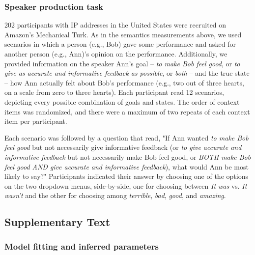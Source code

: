 \documentclass[12pt]{article}
\begin{document}
\subsubsection*{Speaker production task}

202 participants with IP addresses in the United States were recruited on Amazon's Mechanical Turk.
As in the semantics measurements above, we used scenarios in which a person (e.g., Bob) gave some performance and asked for another person (e.g., Ann)'s opinion on the performance. 
Additionally, we provided information on the speaker Ann's goal -- \emph{to make Bob feel good}, or \emph{to give as accurate and informative feedback as possible}, or \emph{both} -- 
and the true state -- how Ann actually felt about Bob's performance (e.g., two out of three hearts, on a scale from zero to three hearts). 
Each participant read 12 scenarios, depicting every possible combination of goals and states. 
The order of context items was randomized, and there were a maximum of two repeats of each context item per participant.

Each scenario was followed by a question that read, "If Ann wanted \emph{to make Bob feel good} but not necessarily give informative feedback (or \emph{to give accurate and informative feedback} but not necessarily make Bob feel good, or \emph{BOTH make Bob feel good AND give accurate and informative feedback}), what would Ann be most likely to say?" Participants indicated their answer by choosing one of the options on the two dropdown menus, side-by-side, one for choosing between \emph{It was} vs. \emph{It wasn't} and the other for choosing among \emph{terrible}, \emph{bad}, \emph{good}, and \emph{amazing}.

\subsection*{Supplementary Text}

\subsubsection*{Model fitting and inferred parameters}
\end{document}
